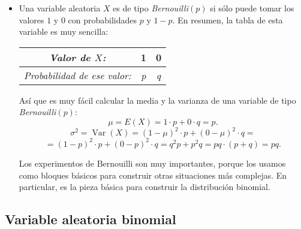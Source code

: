 \begin{itemize}
    \item Una variable aleatoria $X$ es de tipo {\em Bernouilli$(p)$} si sólo puede tomar los valores $1$ y $0$ con probabilidades $p$ y $1-p$. En resumen, la tabla de esta variable es muy sencilla:
        \begin{center}{\bf
        \begin{tabular}[t]{|c|c|c|}
            \hline
            \rule{0cm}{0.5cm}{\em Valor de $X$:}&1&0\\
            \hline
            \rule{0cm}{0.7cm}{\em Probabilidad de ese valor:}&{\em p}&{\em q}\\
            \hline
        \end{tabular}}
        \end{center}
        Así que es muy fácil calcular la media y la varianza de una variable de tipo {\em Bernouilli$(p)$}:
        \[
        \mu=E(X)=1\cdot p+0\cdot q=p.
        \]
        \[
        \sigma^2=\operatorname{Var}(X)=(1-\mu)^2\cdot p+(0-\mu)^2\cdot q=\]
        \[=
        (1-p)^2\cdot p+(0-p)^2\cdot q=q^2p+p^2q=pq\cdot(p+q)=pq.
        \]

        Los experimentos de Bernouilli son muy importantes, porque los usamos como bloques básicos para construir otras situaciones más complejas. En particular, es la pieza básica para construir la distribución binomial.


\end{itemize}

\subsection{Variable aleatoria binomial}

